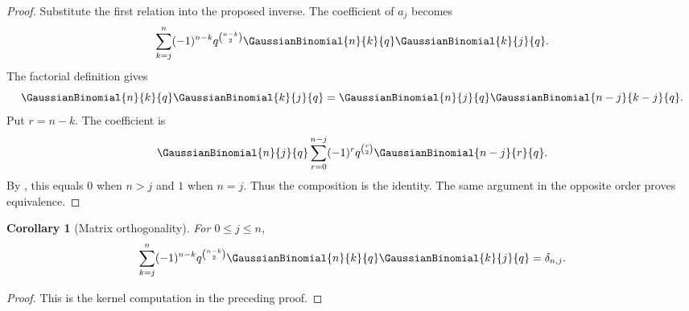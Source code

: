 \documentclass[11pt,a4paper,oneside,openany]{book}
\newtheorem{corollary}[corollary]{Corollary}
\theoremstyle{definition}
\theoremstyle{remark}
\begin{document}
\begin{proof}
Substitute the first relation into the proposed inverse.  The coefficient of $a_j$ becomes
\[
 \sum_{k=j}^{n}(-1)^{n-k}q^{\binom{n-k}{2}}
 \GaussianBinomial{n}{k}{q}\GaussianBinomial{k}{j}{q}.
\]
The factorial definition gives
\[
 \GaussianBinomial{n}{k}{q}\GaussianBinomial{k}{j}{q}=\GaussianBinomial{n}{j}{q}\GaussianBinomial{n-j}{k-j}{q}.
\]
Put $r=n-k$.  The coefficient is
\[
 \GaussianBinomial{n}{j}{q}
 \sum_{r=0}^{n-j}(-1)^rq^{\binom r2}\GaussianBinomial{n-j}{r}{q}.
\]
By , this equals $0$ when $n>j$ and $1$ when $n=j$.  Thus the composition is the identity.  The same argument in the opposite order proves equivalence.
\end{proof}

\begin{corollary}[Matrix orthogonality]\label{cor:qbinomial-orthogonality}
For $0\le j\le n$,
\[
 \sum_{k=j}^{n}(-1)^{n-k}q^{\binom{n-k}{2}}
 \GaussianBinomial{n}{k}{q}\GaussianBinomial{k}{j}{q}=\delta_{n,j}.
\]
\end{corollary}

\begin{proof}
This is the kernel computation in the preceding proof.
\end{proof}
\end{document}
